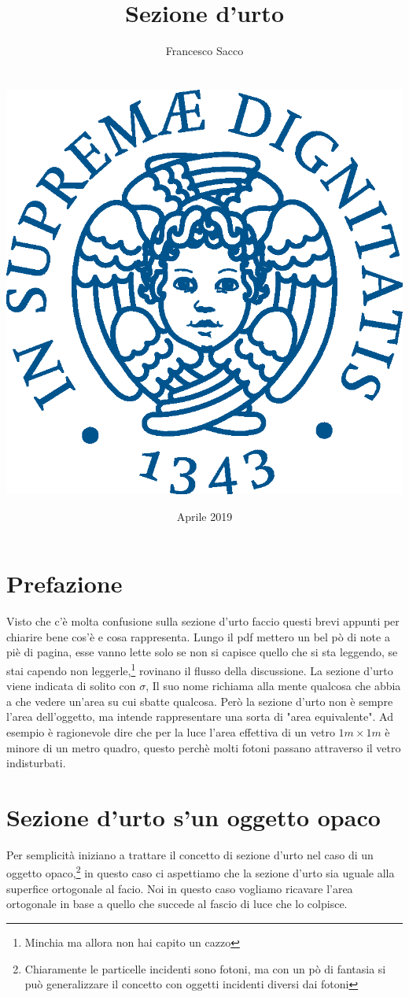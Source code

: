 \documentclass[11pt,a4paper]{article}
\date{{\LARGE Aprile 2019}}
\title{{\myfont Sezione d'urto}}
\author{{\Huge Francesco Sacco}\\ \\ \\
		\includegraphics[scale=0.6]{Immagini/cherubino.eps}\\}
\begin{document}
	\maketitle
	\newpage
	\section*{Prefazione}
		Visto che c'è molta confusione sulla sezione d'urto faccio questi brevi appunti per chiarire bene cos'è e cosa rappresenta.\newline
		Lungo il pdf mettero un bel pò di note a piè di pagina, esse vanno lette solo se non si capisce quello che si sta leggendo, se stai capendo non leggerle,\footnote{Minchia ma allora non hai capito un cazzo} rovinano il flusso della discussione.\newline 
		La sezione d'urto viene indicata di solito con $\sigma$, Il suo nome richiama alla mente qualcosa che abbia a che vedere un'area su cui sbatte qualcosa. Però la sezione d'urto non è sempre l'area dell'oggetto, ma intende rappresentare una sorta di "area equivalente".\newline
		Ad esempio è ragionevole dire che per la luce l'area effettiva di un vetro $1m\times 1m$ è minore di un metro quadro, questo perchè molti fotoni passano attraverso il vetro indisturbati.\newline
	\section{Sezione d'urto s'un oggetto opaco}
	\label{sec:opaco}
		Per semplicità iniziano a trattare il concetto di sezione d'urto nel caso di un oggetto opaco,\footnote{Chiaramente le particelle incidenti sono fotoni, ma con un pò di fantasia si può generalizzare il concetto con oggetti incidenti diversi dai fotoni} in questo caso ci aspettiamo che la sezione d'urto sia uguale alla superfice ortogonale al facio.\newline
		Noi in questo caso vogliamo ricavare l'area ortogonale in base a quello che succede al fascio di luce che lo colpisce.\newline
\end{document}
